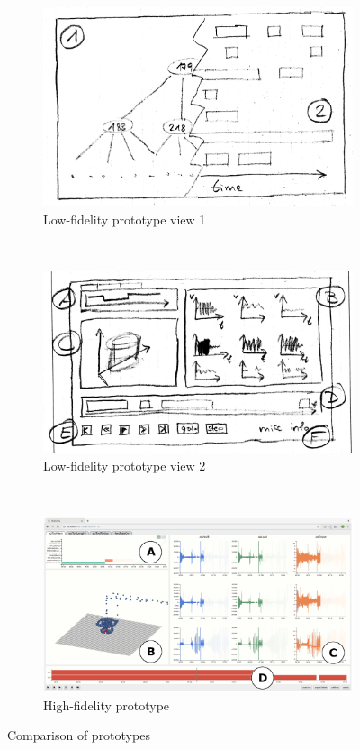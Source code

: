 \documentclass[naustrian]{scrartcl}
\begin{document}
\begin{figure}
    \centering

    \begin{subfigure}{0.5\textwidth}
        \includegraphics[width=\textwidth]{img/proto_1.jpg}
        \caption{Low-fidelity prototype view 1}
        \label{fig:lofi-1}
    \end{subfigure}%
    ~
    \begin{subfigure}{0.5\textwidth}
        \includegraphics[width=\textwidth]{img/proto_2.jpg}
        \caption{Low-fidelity prototype view 2}
        \label{fig:lofi-2}
    \end{subfigure}%
    \\
    \begin{subfigure}{\textwidth}
        \includegraphics[width=\textwidth]{img/screen-labeled.png}
        \caption{High-fidelity prototype}
        \label{fig:hifi}
    \end{subfigure}%
    \caption{Comparison of prototypes}
\end{figure}
\end{document}
